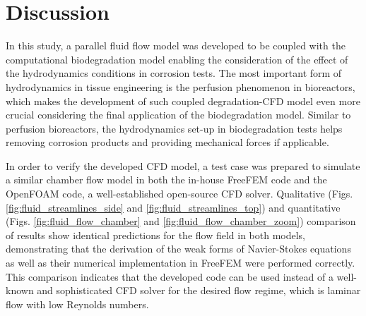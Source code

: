 \section{Discussion}


In this study, a parallel fluid flow model was developed to be coupled with the computational biodegradation model enabling the consideration of the effect of the hydrodynamics conditions in corrosion tests. The most important form of hydrodynamics in tissue engineering is the perfusion phenomenon in bioreactors, which makes the development of such coupled degradation-{CFD} model even more crucial considering the final application of the biodegradation model. Similar to perfusion bioreactors, the hydrodynamics set-up in biodegradation tests helps removing corrosion products and providing mechanical forces if applicable.


In order to verify the developed {CFD} model, a test case was prepared to simulate a similar chamber flow model in both the in-house FreeFEM code and the OpenFOAM code, a well-established open-source {CFD} solver. Qualitative (Figs. \ref{fig:fluid_streamlines_side} and \ref{fig:fluid_streamlines_top}) and quantitative (Figs. \ref{fig:fluid_flow_chamber} and \ref{fig:fluid_flow_chamber_zoom}) comparison of results show identical predictions for the flow field in both models, demonstrating that the derivation of the weak forms of Navier-Stokes equations as well as their numerical implementation in FreeFEM were performed correctly. This comparison indicates that the developed code can be used instead of a well-known and sophisticated {CFD} solver for the desired flow regime, which is laminar flow with low Reynolds numbers.



